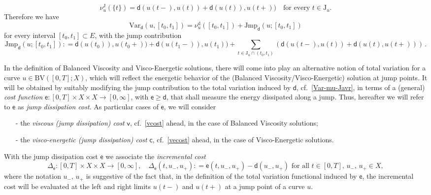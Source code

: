 \documentclass[a4paper,10pt,reqno]{amsart} %
\numberwithin{equation}{section}
\newcommand{\Xs}{X}
\newcommand{\BV}{\mathrm{BV}}
\newcommand{\mdn}{\mathsf{d}}
\newcommand{\md}[2]{\mathsf{d}(#1,#2)}
\newcommand{\Vari}[4]{\mathrm{Var}_{#1}(#2,[#3,#4])}
\newcommand{\lli}[2]{{#1}({#2}{-})}
\newcommand{\rli}[2]{{#1}({#2}{+})}
\newcommand{\jump}[1]{\mathrm{J}_{#1}}
\newcommand{\Jvar}[4]{\mathrm{Jmp}_{#1}(#2;[#3,#4])}
\newcommand{\mum}[2]{\nu_{#1}^{#2}}
\newcommand{\gcostname}{\mathsf{e}}
\newcommand{\gcost}[3]{\mathsf{e}(#1,#2,#3)}
\newcommand{\vecostname}{\mathsf{c}}
\newcommand{\bvcostname}{\mathsf{v}}
\newcommand{\RRR}{\color{red}}
\newcommand{\EEE}{\color{black}}
\begin{document}
\[
\mum u{\mathrm{J}}(\{t\}) = \md{\lli ut}{u(t)} +\md{u(t))}{\rli ut} \quad \text{for every } t \in \jump u.
\]
Therefore we have 
\begin{equation}
\label{Var-mu-Javr}
\Vari {\mdn}u{t_0}{t_1} = \mum u{\mathrm{d}}([t_0,t_1])+ \Jvar {\mdn}{u}{t_0}{t_1}
\end{equation}
for every interval
$[t_0,t_1]\subset E$,
with the jump contribution  
\begin{equation}
\label{d-jump-contribution}
 \Jvar {\mdn}{u}{t_0}{t_1}: =  \md{u(t_0))}{\rli u{t_0}} +  \md{\lli u{t_1})}{ u(t_1)} + \sum_{t\in \jump u \cap (t_0,t_1)} \left( \md{\lli ut}{u(t)} +\md{u(t)}{\rli ut} \right)\,.
\end{equation}
\par
In the definition of Balanced Viscosity and Visco-Energetic solutions, there will come into play an alternative notion of total variation for a curve $u\in \BV([0,T];\Xs)$, which will reflect the energetic behavior of the (Balanced Viscosity/Visco-Energetic) solution at jump points. 
It will  be obtained by suitably modifying  the jump contribution to the total variation induced by $\mdn$, cf.\ \eqref{Var-mu-Javr},  in terms of  a (general) \emph{cost function}
$\gcostname: [0,T] \times \Xs\times \Xs \to [0,\infty]$,  with $\gcostname \geq \mdn$, 
that shall measure the energy dissipated along a jump. Thus,   hereafter we will refer to $\gcostname$ as \emph{jump dissipation cost}.
 As particular cases of $\gcostname$, we will consider   
 \begin{itemize}
 \item[-] the 
 \emph{viscous (jump dissipation) cost}   $\bvcostname$, cf.\ \eqref{vcost} ahead, in the case of Balanced Viscosity solutions;
 \item[-]
  the \emph{visco-energetic (jump dissipation)  cost} $\vecostname$, cf.\ \eqref{vecost} ahead, in the case of Visco-Energetic solutions.
  \end{itemize}
  \par
With the jump dissipation cost $\gcostname$ we associate the  \emph{incremental cost}
\begin{equation}
\label{Delta-e}
\Delta_{\gcostname}: [0,T]\times \Xs \times \Xs \to [0,\infty], \quad \Delta_{\gcostname}(t,u_-,u_+): = \gcost  t{u_-}{u_+} - \md{u_-}{u_+}
 \text{ for all } t\in[0,T], \, u_-,\, u_+ \in \Xs,
\end{equation}
where the notation $u_-,\, u_+$  is suggestive of the fact that, in the definition of the total variation functional induced by $\gcostname$, the incremental cost will be evaluated at the left and right limits $\lli u t$ and $\rli u t$ at a jump point of a curve $u$. 
\end{document}
